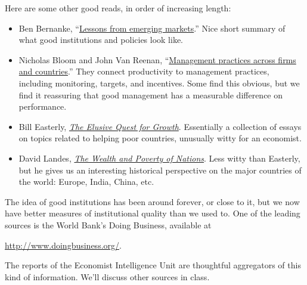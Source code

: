 Here are some other good reads, in order of increasing length:
\begin{itemize}
\item Ben Bernanke,
``\href{http://www.federalreserve.gov/newsevents/speech/Bernanke20110928a.htm}
{Lessons from emerging markets}.''
Nice short summary of what good institutions and policies look like.

\item Nicholas Bloom and John Van Reenan,
``\href{http://www.aeaweb.org/articles.php?doi=10.1257/jep.24.1.203}
    {Management practices across firms and countries}.''
They connect productivity to management practices, including
monitoring, targets, and incentives.
Some find this obvious, but we find it reassuring that
good management has a measurable difference
on performance.

\item Bill Easterly,
\href{http://www.amazon.com/Elusive-Quest-Growth-Economists-Misadventures/dp/0262550423}
{\it The Elusive Quest for Growth}.
Essentially a collection of essays on topics related to helping poor countries,
unusually witty for an economist.

\item David Landes,
\href{http://www.amazon.com/Wealth-Poverty-Nations-Some-Rich/dp/0393318885}
{\it The Wealth and Poverty of Nations}.
Less witty than Easterly, but he gives us an interesting historical
perspective on the major countries of the world:  Europe, India, China, etc.
\end{itemize}

The idea of good institutions has been around forever, or close to it,
but we now have better measures of institutional quality than we used to.
One of the leading sources is the World Bank's Doing Business, available at

\vspace*{\parskip}
\centerline{\url{http://www.doingbusiness.org/}.}

The reports of the Economist Intelligence Unit are thoughtful aggregators
of this kind of information.
We'll discuss other sources in class.
